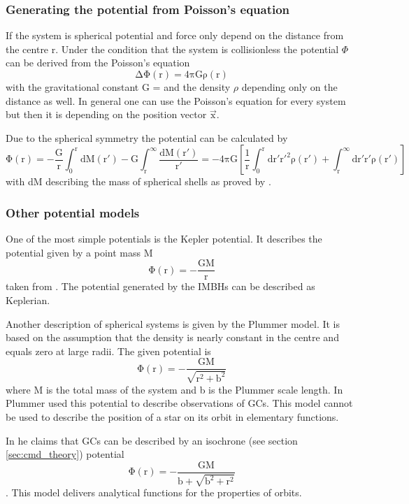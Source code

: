 \subsubsection{Generating the potential from Poisson's equation}\label{sec:poisson}
If the system is spherical potential and force only depend on the distance from the centre r. Under the condition that the system is collisionless the potential \(\Phi\) can be derived from the Poisson's equation \begin{equation}\label{eq:Poisson}
\mathrm{\Delta\Phi(r)=4\pi G \rho(r)}
\end{equation}
with the gravitational constant G =  \citep{2015arXiv150707956M} and the density \(\rho\) depending only on the distance as well. In general one can use the Poisson's equation for every system but then it is depending on the position vector \(\vec{\mathrm{x}}\). 
\par Due to the spherical symmetry the potential can be calculated by 
\begin{equation}\label{eq:numerical_poisson}
\mathrm{\Phi(r)=-\frac{G}{r}\int_0^r{\mathrm{d}M(r')}-G\int_r^{\infty}{\frac{\mathrm{d}M(r')}{r'}}=-4\pi G\left[\frac{1}{r}\int_0^r\mathrm{d}r'r'^2\rho(r')+\int_r^{\infty}\mathrm{d}r'r'\rho(r')\right]}
\end{equation} with dM describing the mass of spherical shells as proved by \citet[eq. 2.28]{2008gady.book.....B}. 
\subsubsection{Other potential models}\label{sec:other_pot}
One of the most simple potentials is the Kepler potential. It describes the potential given by a point mass M
\begin{equation}\label{eq:kep_pot}
\mathrm{\Phi(r)=-\frac{GM}{r}}
\end{equation}  taken from \citet[eq. 2.34]{2008gady.book.....B}. The potential generated by the \acp{IMBH} can be described  as Keplerian. 
\par Another description of spherical systems is given by the Plummer model. It is based on the assumption that the density is nearly constant in the centre and equals zero at large radii. The given potential is 
\begin{equation}\label{eq:Plum_pot}
\mathrm{\Phi(r)=-\frac{GM}{\sqrt{r^2+b^2}}}
\end{equation}
\citep[eq. 2.44a]{2008gady.book.....B} where M is the total mass of the system and b is the Plummer scale length. In \citet{1911MNRAS..71..460P} Plummer used this potential to describe observations of \acp{GC}. This model cannot be used to describe the position of a star on its orbit in elementary functions. 
\par In \citet{2014arXiv1411.4937B} he claims that \acp{GC} can be described by an isochrone (see section \ref{sec:cmd_theory}) potential 
\begin{equation}\label{eq:isochr_pot}
\mathrm{\Phi(r)=-\frac{GM}{b+\sqrt{b^2+r^2}}}
\end{equation} 
\citep[eq. 2.47]{2008gady.book.....B}. This model delivers analytical functions for the properties of orbits.
